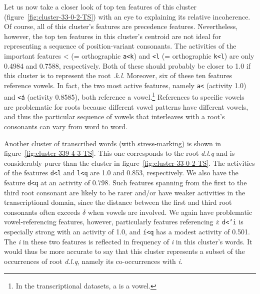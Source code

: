 Let us now take a closer look of top ten features of this cluster (figure~\ref{fig:cluster-33-0-2-TS}) with an eye to explaining its relative incoherence. 
Of course, all of this cluster's features are precedence features. Nevertheless, however, the top ten features in this cluster's centroid are not ideal for representing 
a %
sequence of position-variant consonants.
The activities of the important features 
{<} (= orthographic \texttt{a<k}) and \texttt{<l} (= orthographic \texttt{k<l}) are only 0.4984 and
 0.7588, respectively. Both of these should probably be closer to 1.0 if this cluster is to represent the
 root \textit{{.k.l}}. Moreover, six of these ten features reference vowels. 
In fact, the two most active features, namely \texttt{a<} (activity 1.0) and \texttt{<\'{a}} (activity 0.8585), both reference a vowel.\footnote{In the transcriptional datasets, \textsf{a} is a vowel.} References to specific vowels are problematic for roots because different vowel patterns have different vowels, and thus the particular sequence of vowels that interleaves with a root's consonants can vary from word to word.

Another cluster of transcribed words (with stress-marking) is shown in figure~\ref{fig:cluster-339-4-3-TS}. 
This one corresponds to the root \textit{d.l.q} and is considerably purer than the 
cluster in figure~\ref{fig:cluster-33-0-2-TS}. The activities of the features \texttt{d<l} and \texttt{l<q}  
are 1.0 and 0.853, respectively. We also have the feature \texttt{d<q} at an activity of 0.798. Such features spanning 
from the first to the third root consonant are likely to be rarer and/or have weaker activities in the transcriptional domain, 
since the distance between the first and third root consonants often exceeds $\delta$ when vowels are 
involved. We again have problematic vowel-referencing features, however, particularly features 
referencing \textit{i}: \texttt{d<\a'{i}} is especially strong with an activity of 1.0, and \texttt{\'{i}<q} 
has a modest activity of 0.501. The \textit{i} in these two features is reflected in frequency of \textit{i} in 
this cluster's words. It would thus be more accurate to say that this cluster represents a subset of the 
occurrences of root \textit{d.l.q}, namely its co-occurrences with \textit{i}. 

